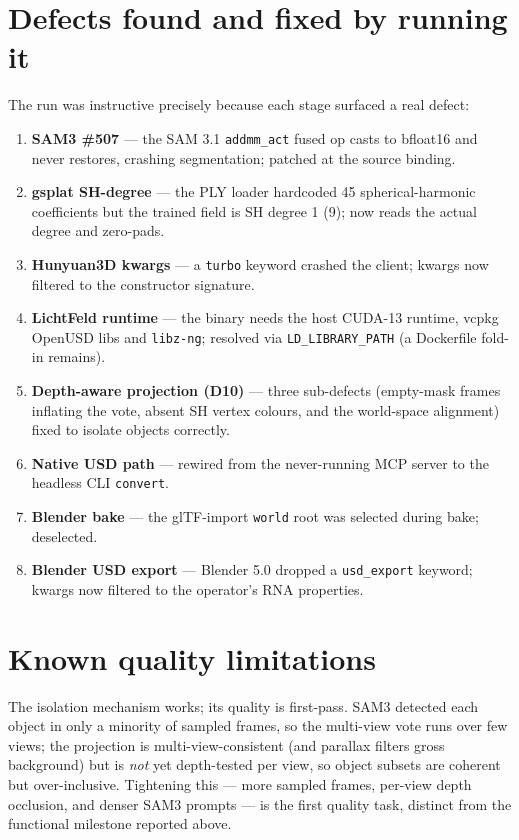 \documentclass[a4paper,11pt]{report}
\newcommand{\code}[1]{\texttt{#1}}
\begin{document}
\section{Defects found and fixed by running it}
The run was instructive precisely because each stage surfaced a real defect:
\begin{enumerate}
  \item \textbf{SAM3 \#507} --- the SAM 3.1 \code{addmm\_act} fused op casts to bfloat16 and never
        restores, crashing segmentation; patched at the source binding.
  \item \textbf{gsplat SH-degree} --- the PLY loader hardcoded 45 spherical-harmonic coefficients but the
        trained field is SH degree 1 (9); now reads the actual degree and zero-pads.
  \item \textbf{Hunyuan3D kwargs} --- a \code{turbo} keyword crashed the client; kwargs now filtered to
        the constructor signature.
  \item \textbf{LichtFeld runtime} --- the binary needs the host CUDA-13 runtime, vcpkg OpenUSD libs and
        \code{libz-ng}; resolved via \code{LD\_LIBRARY\_PATH} (a Dockerfile fold-in remains).
  \item \textbf{Depth-aware projection (D10)} --- three sub-defects (empty-mask frames inflating the vote,
        absent SH vertex colours, and the world-space alignment) fixed to isolate objects correctly.
  \item \textbf{Native USD path} --- rewired from the never-running MCP server to the headless CLI
        \code{convert}.
  \item \textbf{Blender bake} --- the glTF-import \code{world} root was selected during bake; deselected.
  \item \textbf{Blender USD export} --- Blender 5.0 dropped a \code{usd\_export} keyword; kwargs now
        filtered to the operator's RNA properties.
\end{enumerate}

\section{Known quality limitations}
The isolation mechanism works; its quality is first-pass. SAM3 detected each object in only a minority of
sampled frames, so the multi-view vote runs over few views; the projection is multi-view-consistent (and
parallax filters gross background) but is \emph{not} yet depth-tested per view, so object subsets are
coherent but over-inclusive. Tightening this — more sampled frames, per-view depth occlusion, and denser
SAM3 prompts — is the first quality task, distinct from the functional milestone reported above.
\end{document}
